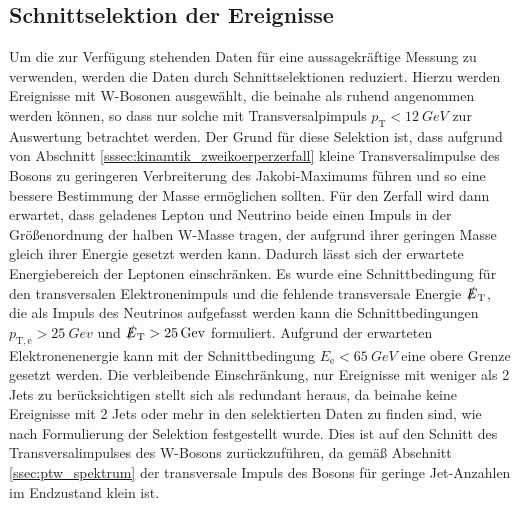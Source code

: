 \documentclass[11pt, a4paper]{article}
\numberwithin{equation}{section}
\begin{document}
\subsection{Schnittselektion der Ereignisse}
\label{ssec:schnittselektion}
Um die zur Verfügung stehenden Daten für eine aussagekräftige Messung zu verwenden, werden die Daten durch Schnittselektionen reduziert.
Hierzu werden Ereignisse mit W-Bosonen ausgewählt, die beinahe als ruhend angenommen werden können, so dass nur solche mit Transversalpimpuls $p_\mathrm{T}<\SI{12}{GeV}$ zur Auswertung betrachtet werden.
Der Grund für diese Selektion ist, dass aufgrund von Abschnitt \ref{sssec:kinamtik_zweikoerperzerfall} kleine Transversalimpulse des Bosons zu geringeren Verbreiterung des Jakobi-Maximums führen und so eine bessere Bestimmung der Masse ermöglichen sollten.
Für den Zerfall wird dann erwartet, dass geladenes Lepton und Neutrino beide einen Impuls in der Größenordnung der halben W-Masse tragen, der aufgrund ihrer geringen Masse gleich ihrer Energie gesetzt werden kann.
Dadurch lässt sich der erwartete Energiebereich der Leptonen einschränken.
Es wurde eine Schnittbedingung für den transversalen Elektronenimpuls und die fehlende transversale Energie $\slashed{E}_\mathrm{T}$, die als Impuls des Neutrinos aufgefasst werden kann die Schnittbedingungen $p_\mathrm{T,e}>\SI{25}{Gev}$ und $\slashed{E}_\mathrm{T}>\SI{25}{Gev}$ formuliert.
Aufgrund der erwarteten Elektronenenergie kann mit der Schnittbedingung $E_\mathrm{e}<\SI{65}{GeV}$ eine obere Grenze gesetzt werden.
Die verbleibende Einschränkung, nur Ereignisse mit weniger als \num{2} Jets zu berücksichtigen stellt sich als redundant heraus, da beinahe keine Ereignisse mit \num{2} Jets oder mehr in den selektierten Daten zu finden sind, wie nach Formulierung der Selektion festgestellt wurde.
Dies ist auf den Schnitt des Transversalimpulses des W-Bosons zurückzuführen, da gemäß Abschnitt \ref{ssec:ptw_spektrum} der transversale Impuls des Bosons für geringe Jet-Anzahlen im Endzustand klein ist.
\end{document}
